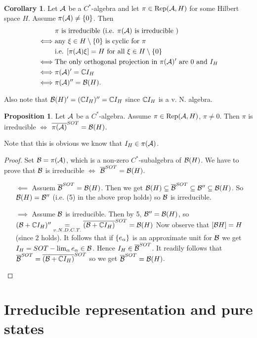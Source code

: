 \documentclass[10pt,english,a4paper]{article}
\theoremstyle{definition}
\newtheorem*{corollary}{Corollary}
\newtheorem*{proposition}{Proposition}
\DeclareMathOperator{\Rep}{Rep}
\begin{document}
\begin{corollary}
    Let $\mathcal{A}$ be a $C^*$-algebra and let $\pi \in \Rep(\As,H)$ for some 
Hilbert space $H$. Assume $\pi(\mathcal{A})\neq \{0\}$.
Then
\begin{align*}
    &\text{$\pi$ is irreducible (i.e. $\pi(\mathcal{A})$ is irreducible )}\\
\iff&\text{any $\xi \in H\setminus\{0\}$ is cyclic for $\pi$} \\
& \text{i.e. $[\pi(\mathcal{A})\xi] =H$ for all $\xi\in H\setminus \{0\}$} \\
\iff& \text{The only orthogonal projection in $\pi(\mathcal{A})'$ are $0$ and $I_H$} \\
\iff& \pi(\mathcal{A})' = \mathbb{C} I_H \\
\iff& \pi(\mathcal{A})'' = \mathcal{B}(H).
\end{align*}
\end{corollary}


Also note that $\mathcal{B}(H)' = (\mathbb{C} I_H)'' = \mathbb{C} I_H$  since $\mathbb{C} I_H$ is a v. N. algebra. 

\begin{proposition} Let $\mathcal{A}$ be a $C^*$-algebra.
    Assume $\pi \in \Rep(\As,H)$, $\pi\neq 0$. Then $\pi$ is irreducible 
$\iff$ $\overline{\pi(\mathcal{A})}^{SOT} = \mathcal{B}(H)$.
\end{proposition}
Note that this is obvious we know that $I_H \in \pi(\mathcal{A})$.
\begin{proof}
    Set $\mathcal{B} = \pi(\mathcal{A})$, which is a non-zero $C^*$-subalgebra of $\mathcal{B}(H)$.
We have to prove that $\mathcal{B}$ is irreducible $\iff$ $\overline{\mathcal{B}}^{SOT} = \mathcal{B}(H)$.
\begin{itemize}
    \item[$\impliedby$] Assuem $\overline{\mathcal{B}}^{SOT} = \mathcal{B}(H)$. Then we get 
$\mathcal{B}(H) \subseteq \overline{\mathcal{B}}^{SOT}\subseteq \mathcal{B}''\subseteq \mathcal{B}(H)$. So
$\mathcal{B}(H)= \mathcal{B}''$ (i.e. (5) in the above prop holds) so $\mathcal{B}$ is irreducible.
\item[$\implies$] Assume $\mathcal{B}$ is irreducible. Then by 5, $\mathcal{B}'' = \mathcal{B}(H)$, 
so $(\mathcal{B}+\mathbb{C} I_H)'' \underset{v.N. D.C.T.}{=} \overline{(\mathcal{B} + \mathbb{C} I_H)}^{SOT} = \mathcal{B}(H)$ 
Now observe that $[\mathcal{B} H] = H$ (since $2$ holds). It follows that if 
$\{ e_{\alpha}\}$ is an approximate unit for $\mathcal{B}$ we get $I_H = SOT-\lim_{\alpha}e_{\alpha} \in \mathcal{B}$.
Hence $I_{H} \in \overline{\mathcal{B}}^{SOT}$. It readily follows that 
$\overline{\mathcal{B}}^{SOT} = \overline{(\mathcal{B} + \mathbb{C} I_H)}^{SOT}$ so we get $\overline{\mathcal{B}}^{SOT} = \mathcal{B}(H)$.
\end{itemize}
\end{proof}


\section{Irreducible representation and pure states}
\end{document}
